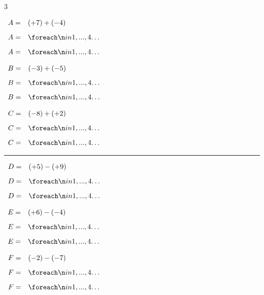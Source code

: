 \documentclass[a4paper]{book}
\begin{document}
{\begin{exerciceNote}{3}
        \noindent
        \begin{minipage}{0.3\linewidth}
            $\begin{array}{ll}
                A = & (+7) + (-4) \\[2ex]
                A = & \points[4] \\[2ex]
                A = & \points[4]
            \end{array}$
        \end{minipage}
        \hfill \vline \hfill
        \begin{minipage}{0.33\linewidth}
            $\begin{array}{ll}
                B = & (-3) + (-5) \\[2ex]
                B = & \points[4] \\[2ex]
                B = & \points[4]
            \end{array}$
        \end{minipage}
        \hfill \vline \hfill
        \begin{minipage}{0.3\linewidth}
            $\begin{array}{ll}
                C = & (-8) + (+2) \\[2ex]
                C = & \points[4] \\[2ex]
                C = & \points[4]
            \end{array}$
        \end{minipage}
        
        \vspace{1cm}
        \hrule
        \vspace{1cm}
        
        \begin{minipage}{0.3\linewidth}
            $\begin{array}{ll}
                D = & (+5) - (+9) \\[2ex]
                D = & \points[4] \\[2ex]
                D = & \points[4]
            \end{array}$
        \end{minipage}
        \hfill \vline \hfill
        \begin{minipage}{0.33\linewidth}
            $\begin{array}{ll}
                E = & (+6) - (-4) \\[2ex]
                E = & \points[4] \\[2ex]
                E = & \points[4]
            \end{array}$
        \end{minipage}
        \hfill \vline \hfill
        \begin{minipage}{0.3\linewidth}
            $\begin{array}{ll}
                F = & (-2) - (-7) \\[2ex]
                F = & \points[4] \\[2ex]
                F = & \points[4]
            \end{array}$
        \end{minipage}
    \end{exerciceNote}


}
\end{document}
